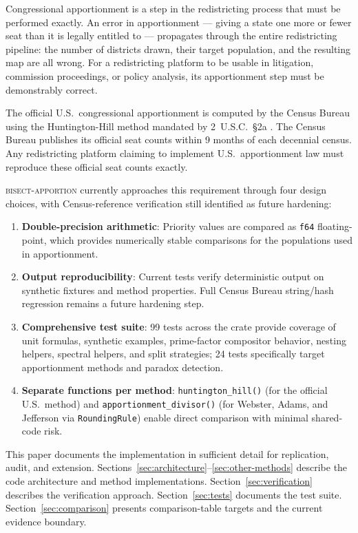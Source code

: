 Congressional apportionment is a step in the redistricting process
that must be performed exactly.
An error in apportionment --- giving a state one more or fewer seat
than it is legally entitled to --- propagates through the entire
redistricting pipeline: the number of districts drawn, their target
population, and the resulting map are all wrong.
For a redistricting platform to be usable in litigation, commission
proceedings, or policy analysis, its apportionment step must be
demonstrably correct.

The official U.S.\ congressional apportionment is computed by the
Census Bureau using the Huntington-Hill method mandated by
2~U.S.C.\ \S2a \citep{usc2a}.
The Census Bureau publishes its official seat counts within 9 months
of each decennial census.
Any redistricting platform claiming to implement U.S.\ apportionment
law must reproduce these official seat counts exactly.

\textsc{bisect-apportion} currently approaches this requirement through four
design choices, with Census-reference verification still identified as future
hardening:
\begin{enumerate}
  \item \textbf{Double-precision arithmetic}: Priority values are compared
    as \texttt{f64} floating-point, which provides numerically stable
    comparisons for the populations used in apportionment.
  \item \textbf{Output reproducibility}: Current tests verify deterministic
    output on synthetic fixtures and method properties.  Full Census Bureau
    string/hash regression remains a future hardening step.
  \item \textbf{Comprehensive test suite}: 99 tests across the crate provide
    coverage of unit formulas, synthetic examples, prime-factor compositor
    behavior, nesting helpers, spectral helpers, and split strategies; 24 tests
    specifically target apportionment methods and paradox detection.
  \item \textbf{Separate functions per method}: \texttt{huntington\_hill()}
    (for the official U.S.\ method) and \texttt{apportionment\_divisor()}
    (for Webster, Adams, and Jefferson via \texttt{RoundingRule}) enable
    direct comparison with minimal shared-code risk.
\end{enumerate}

This paper documents the implementation in sufficient detail for
replication, audit, and extension.
Sections~\ref{sec:architecture}--\ref{sec:other-methods} describe the
code architecture and method implementations.
Section~\ref{sec:verification} describes the verification approach.
Section~\ref{sec:tests} documents the test suite.
Section~\ref{sec:comparison} presents comparison-table targets and the current
evidence boundary.

